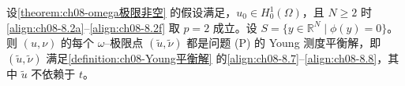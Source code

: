 \documentclass[../../main.tex]{subfiles}%
\begin{document}
\begin{theorem}\label{theorem:ch08-平衡解}
设\cref{theorem:ch08-omega极限非空} 的假设满足，$u_0\in H^1_0(\Omega)$，且 $N\geqslant2$ 时\eqref{align:ch08-8.2a}--\eqref{align:ch08-8.2f} 取 $p=2$ 成立。设 $S=\{y\in\mathbb{R}^N\mid\phi(y)=0\}$。则 $(u,\nu)$ 的每个 $\omega$--极限点 $(\tilde u,\tilde\nu)$ 都是问题 (P) 的 Young 测度平衡解，即 $(\tilde u,\tilde\nu)$ 满足\cref{definition:ch08-Young平衡解} 的\eqref{align:ch08-8.7}--\eqref{align:ch08-8.8}，其中 $\tilde u$ 不依赖于 $t$。
\end{theorem}

\end{document}

